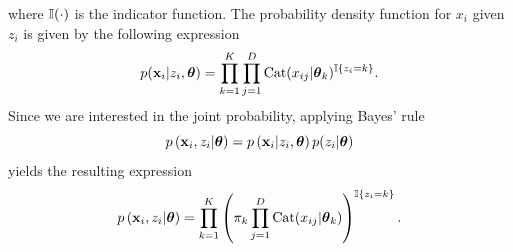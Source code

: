 \documentclass[12pt]{article}
\begin{document}
where $\mathbb{I}(\cdot)$ is the indicator function. The probability density function for $x_i$ given $z_i$ is given by the following expression
\begin{equation}\label{eq:x_given_z}
p(\mathbf{x}_i|z_i,\boldsymbol\theta) = \prod_{k=1}^{K}\prod_{j=1}^{D}\operatorname{\mathrm{Cat}}(x_{ij}|\boldsymbol\theta_k)^{\mathbb{I} \lbrace z_i=k \rbrace}.
\end{equation}
Since we are interested in the joint probability, applying Bayes' rule
\begin{equation}
p\left(\mathbf{x}_{i},z_{i}|\boldsymbol\theta\right) = p\left(\mathbf{x}_{i}|z_{i},\boldsymbol\theta\right) p(z_{i}|\boldsymbol\theta)
\end{equation}
yields the resulting expression
\begin{equation}
p\left(\mathbf{x}_{i},z_{i}|\boldsymbol\theta\right) = \prod\limits_{k=1}^{K}\left( \pi_{k} \prod \limits_{j=1}^{D} \text{Cat}(x_{ij}|\boldsymbol\theta_{k}) \right)^{\mathbb{I}\lbrace z_{i}=k \rbrace}.
\end{equation}
\end{document}
